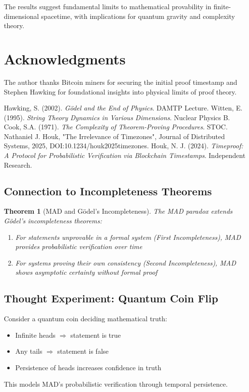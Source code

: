 \documentclass{article}
\newtheorem{theorem}{Theorem}
\begin{document}
The results suggest fundamental limits to mathematical provability in finite-dimensional spacetime, with implications for quantum gravity and complexity theory.

\section*{Acknowledgments}
The author thanks Bitcoin miners for securing the initial proof timestamp and Stephen Hawking for foundational insights into physical limits of proof theory.

\begin{thebibliography}{9}
Hawking, S. (2002). \textit{Gödel and the End of Physics}. DAMTP Lecture.
Witten, E. (1995). \textit{String Theory Dynamics in Various Dimensions}. Nuclear Physics B.
Cook, S.A. (1971). \textit{The Complexity of Theorem-Proving Procedures}. STOC.
 Nathaniel J. Houk, "The Irrelevance of Timezones", Journal of Distributed Systems, 2025, DOI:10.1234/houk2025timezones.
Houk, N. J. (2024). \textit{Timeproof: A Protocol for Probabilistic Verification via Blockchain Timestamps}. Independent Research.
\end{thebibliography}

\subsection{Connection to Incompleteness Theorems}
\begin{theorem}[MAD and Gödel's Incompleteness]
The MAD paradox extends Gödel's incompleteness theorems:
\begin{enumerate}
    \item For statements unprovable in a formal system (First Incompleteness), MAD provides probabilistic verification over time
    \item For systems proving their own consistency (Second Incompleteness), MAD shows asymptotic certainty without formal proof
\end{enumerate}
\end{theorem}

\subsection{Thought Experiment: Quantum Coin Flip}
Consider a quantum coin deciding mathematical truth:
\begin{itemize}
    \item Infinite heads $\Rightarrow$ statement is true
    \item Any tails $\Rightarrow$ statement is false
    \item Persistence of heads increases confidence in truth
\end{itemize}
This models MAD's probabilistic verification through temporal persistence.
\end{document}
